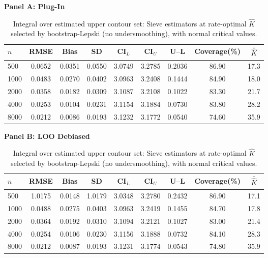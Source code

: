 \begin{table}[!h]
\centering
\small
\caption{Integral over estimated upper contour set: Sieve estimators at rate-optimal $\hat{K}$ selected by bootstrap-Lepski (no undersmoothing), with normal critical values.}
\label{tab:Sim2_Disk_RateOpt}
\vspace{0.3em}
\textbf{Panel A: Plug-In}
\begin{tabular}{lcccccccc}
\hline\hline
$n$ & RMSE & Bias & SD & CI$_L$ & CI$_U$ & U--L & Coverage(\%) & $\bar{\hat{K}}$\\
\hline
500 & 0.0652 & 0.0351 & 0.0550 & 3.0749 & 3.2785 & 0.2036 & 86.90 & 17.3\\
1000 & 0.0483 & 0.0270 & 0.0402 & 3.0963 & 3.2408 & 0.1444 & 84.90 & 18.0\\
2000 & 0.0358 & 0.0182 & 0.0309 & 3.1087 & 3.2108 & 0.1022 & 83.30 & 21.7\\
4000 & 0.0253 & 0.0104 & 0.0231 & 3.1154 & 3.1884 & 0.0730 & 83.80 & 28.2\\
8000 & 0.0212 & 0.0086 & 0.0193 & 3.1232 & 3.1772 & 0.0540 & 74.60 & 35.9\\
\hline\hline
\end{tabular}
\vspace{0.3em}
\textbf{Panel B: LOO Debiased}
\begin{tabular}{lcccccccc}
\hline\hline
$n$ & RMSE & Bias & SD & CI$_L$ & CI$_U$ & U--L & Coverage(\%) & $\bar{\hat{K}}$\\
\hline
500 & 1.0175 & 0.0148 & 1.0179 & 3.0348 & 3.2780 & 0.2432 & 86.90 & 17.1\\
1000 & 0.0488 & 0.0275 & 0.0403 & 3.0963 & 3.2419 & 0.1455 & 84.70 & 17.8\\
2000 & 0.0364 & 0.0192 & 0.0310 & 3.1094 & 3.2121 & 0.1027 & 83.00 & 21.4\\
4000 & 0.0254 & 0.0106 & 0.0230 & 3.1156 & 3.1888 & 0.0732 & 84.10 & 28.3\\
8000 & 0.0212 & 0.0087 & 0.0193 & 3.1231 & 3.1774 & 0.0543 & 74.80 & 35.9\\
\hline\hline
\end{tabular}
\end{table}
